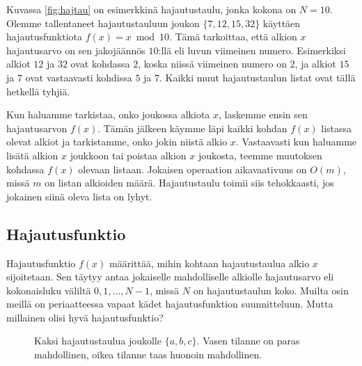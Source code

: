 Kuvassa \ref{fig:hajtau} on esimerkkinä hajautustaulu,
jonka kokona on $N=10$.
Olemme tallentaneet hajautustauluun joukon $\{7,12,15,32\}$
käyttäen hajautusfunktiota $f(x)=x \bmod 10$.
Tämä tarkoittaa, että alkion $x$ hajautusarvo on sen jakojäännös $10$:llä
eli luvun viimeinen numero.
Esimerkiksi alkiot $12$ ja $32$ ovat kohdassa $2$,
koska niissä viimeinen numero on $2$,
ja alkiot $15$ ja $7$ ovat vastaavasti kohdissa $5$ ja $7$.
Kaikki muut hajautustaulun listat ovat tällä hetkellä tyhjiä.

Kun haluamme tarkistaa, onko joukossa alkiota $x$,
laskemme ensin sen hajautusarvon $f(x)$.
Tämän jälkeen käymme läpi kaikki kohdan $f(x)$
listassa olevat alkiot ja tarkistamme,
onko jokin niistä alkio $x$.
Vastaavasti kun haluamme lisätä alkion $x$ joukkoon
tai poistaa alkion $x$ joukosta,
teemme muutoksen kohdassa $f(x)$ olevaan listaan.
Jokaisen operaation aikavaativuus on $O(m)$,
missä $m$ on listan alkioiden määrä.
Hajautustaulu toimii siis tehokkaasti, jos jokainen
siinä oleva lista on lyhyt.

\subsection{Hajautusfunktio}

Hajautusfunktio $f(x)$ määrittää, mihin kohtaan hajautustaulua
alkio $x$ sijoitetaan.
Sen täytyy antaa jokaiselle mahdolliselle alkiolle
hajautusarvo eli kokonaisluku väliltä $0,1,\dots,N-1$,
missä $N$ on hajautustaulun koko.
Muilta osin meillä on periaatteessa vapaat kädet
hajautusfunktion suunnitteluun.
Mutta millainen olisi hyvä hajautusfunktio?

\begin{figure}
\caption{Kaksi hajautustaulua joukolle $\{a,b,c\}$.
Vasen tilanne on paras mahdollinen, oikea tilanne taas
huonoin mahdollinen.}
\label{fig:hajjak}
\end{figure}

